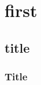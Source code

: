 \documentclass[12ppt,a4paper]{ctexbook}
\begin{document}
\part{first}
\chapter{title}
\section{Title}
\end{document}
